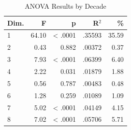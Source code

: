 \begin{table}[H]
  \centering
  \caption{ANOVA Results by Decade}
  \label{tab:anova_decade}
  \begin{tabular}{l r r r r}
    Dim. & F & p & R$^2$ & \% \\
    \hline
    1 & 64.10 & < .0001 & .35593 & 35.59 \\
    2 & 0.43 & 0.882 & .00372 & 0.37 \\
    3 & 7.93 & < .0001 & .06399 & 6.40 \\
    4 & 2.22 & 0.031 & .01879 & 1.88 \\
    5 & 0.56 & 0.787 & .00483 & 0.48 \\
    6 & 1.28 & 0.259 & .01089 & 1.09 \\
    7 & 5.02 & < .0001 & .04149 & 4.15 \\
    8 & 7.02 & < .0001 & .05706 & 5.71 \\
  \end{tabular}
\end{table}
